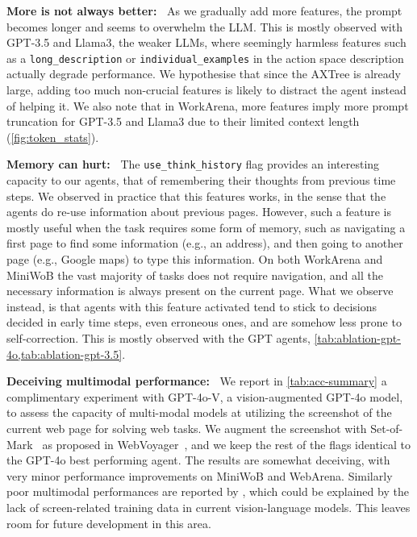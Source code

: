 \documentclass{article}
\theoremstyle{plain}
\theoremstyle{definition}
\theoremstyle{remark}
\newcommand{\paragraphtight}[1]{\textbf{#1~}}
\begin{document}
\paragraphtight{More is not always better:} As we gradually add more features, the prompt becomes longer and seems to overwhelm the LLM. This is mostly observed with GPT-3.5 and Llama3, the weaker LLMs, where seemingly harmless features such as a \texttt{long\_description} or \texttt{individual\_examples} in the action space description actually degrade performance. We hypothesise that since the AXTree is already large, adding too much non-crucial features is likely to distract the agent instead of helping it. We also note that in WorkArena, more features imply more prompt truncation for GPT-3.5 and Llama3 due to their limited context length (\cref{fig:token_stats}).

\paragraphtight{Memory can hurt:} The \texttt{use\_think\_history} flag provides an interesting capacity to our agents, that of remembering their thoughts from previous time steps. We observed in practice that this features works, in the sense that the agents do re-use information about previous pages. However, such a feature is mostly useful when the task requires some form of memory, such as navigating a first page to find some information (e.g., an address), and then going to another page (e.g., Google maps) to type this information. On both WorkArena and MiniWoB the vast majority of tasks does not require navigation, and all the necessary information is always present on the current page. What we observe instead, is that agents with this feature activated tend to stick to decisions decided in early time steps, even erroneous ones, and are somehow less prone to self-correction. This is mostly observed with the GPT agents, \cref{tab:ablation-gpt-4o,tab:ablation-gpt-3.5}.

\paragraphtight{Deceiving multimodal performance:} We report in \cref{tab:acc-summary} a complimentary experiment with GPT-4o-V, a vision-augmented GPT-4o model, to assess the capacity of multi-modal models at utilizing the screenshot of the current web page for solving web tasks. We augment the screenshot with Set-of-Mark~\citep{yang2023set} as proposed in WebVoyager~\citep{he2024webvoyager}, and we keep the rest of the flags identical to the GPT-4o best performing agent. The results are somewhat deceiving, with very minor performance improvements on MiniWoB and WebArena. Similarly poor multimodal performances are reported by \citet{xie2024osworld}, which could be explained by the lack of screen-related training data in current vision-language models. This leaves room for future development in this area.
\end{document}
